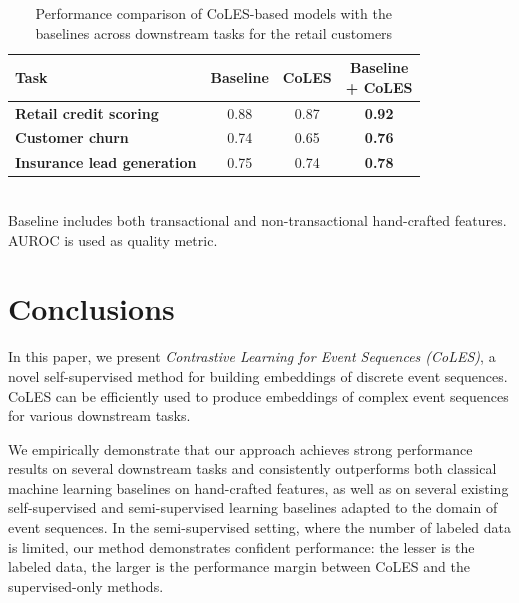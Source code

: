 \documentclass[sigconf]{acmart}
\begin{document}
\begin{table}
    \centering
    \caption{
        Performance comparison of CoLES-based models with the baselines across downstream
        tasks for the retail customers
    }
    \begin{tabularx}{\linewidth}{Xccc}
        \toprule
            \textbf{Task }
            & \textbf{Baseline}
            & \textbf{CoLES}
            & \makecell{\textbf{Baseline}\\\textbf{+ CoLES}}
            \\
        \midrule
            \textbf{Retail credit scoring} & 0.88 & 0.87 & \textbf{0.92} \\
            \textbf{Customer churn} & 0.74 & 0.65 & \textbf{0.76} \\
            \textbf{Insurance lead generation} & 0.75 & 0.74 & \textbf{0.78} \\ %
        \bottomrule
    \end{tabularx}%
    \\
    \small{
        Baseline includes both transactional and non-transactional hand-crafted
        features. AUROC is used as quality metric.
    }
    \label{tab-internal-person}
\end{table}


\section{Conclusions} \label{sec-conclusions}

In this paper, we present \emph{Contrastive Learning for Event Sequences (CoLES)}, a novel
self-supervised method for building embeddings of discrete event sequences. CoLES can be
efficiently used to produce embeddings of complex event sequences for various downstream
tasks.

We empirically demonstrate that our approach achieves strong performance results on
several downstream tasks and consistently outperforms both classical machine learning
baselines on hand-crafted features, as well as on several existing self-supervised and
semi-supervised learning baselines adapted to the domain of event sequences.
% 
In the semi-supervised setting, where the number of labeled data is limited, our method
demonstrates confident performance: the lesser is the labeled data, the larger is
the performance margin between CoLES and the supervised-only methods.
\end{document}
